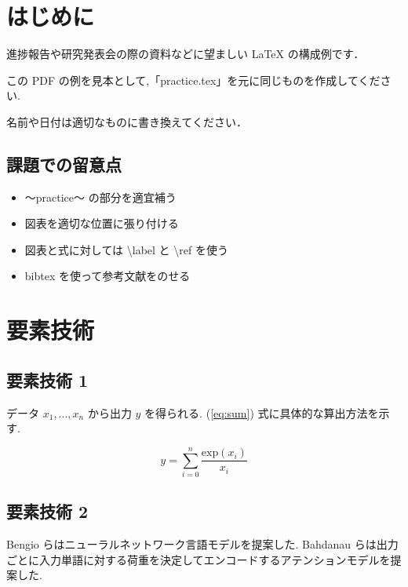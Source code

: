 \documentclass[twocolumn]{jarticle}     %
\begin{document}

\section{はじめに}
進捗報告や研究発表会の際の資料などに望ましい LaTeX の構成例です．\par
この PDF の例を見本として,「practice.tex」を元に同じものを作成してください.\par
名前や日付は適切なものに書き換えてください．

\subsection{課題での留意点}

\begin{itemize}
\item 〜practice〜 の部分を適宜補う
\item 図表を適切な位置に張り付ける
\item 図表と式に対しては \textbackslash label と \textbackslash ref を使う
\item bibtex を使って参考文献をのせる
\end{itemize}

\section{要素技術}

\subsection{要素技術 1}
データ $x_{1},...,x_{n}$ から出力 $y$ を得られる.  (\ref{eq:sum}) 式に具体的な算出方法を示す.

\begin{equation}
  y = \sum^{n}_{i=0} \frac{\mathrm{exp}(x_{i})}{x_{i}}
  \label{eq:sum}
\end{equation}

\subsection{要素技術 2}
Bengio らはニューラルネットワーク言語モデルを提案した\cite{translate}.
 Bahdanau らは出力ごとに入力単語に対する荷重を決定してエンコードするアテンションモデルを提案した\cite{FFNN}.
\end{document}
